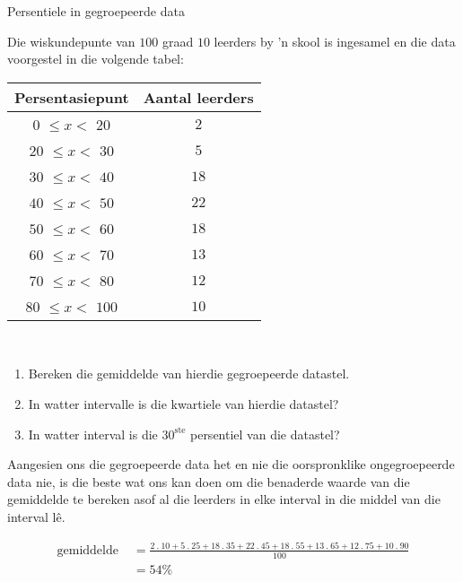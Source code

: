 \begin{wex}{Persentiele in gegroepeerde data}
{Die wiskundepunte van $100$ graad $10$ leerders by ’n skool is ingesamel en die data voorgestel in die volgende tabel:\\
    \begin{center}
      \begin{tabular}{|c|c|}  \hline
       
       \textbf{Persentasiepunt} & \textbf{Aantal leerders} \\  \hline

         $0$  $ \leq x < $   $20$ &  $2$ \\ \hline
        $20$  $ \leq x < $   $30$ &  $5$ \\\hline
        $30$  $ \leq x < $   $40$ & $18$ \\\hline
        $40$  $ \leq x < $   $50$ & $22$ \\\hline
        $50$  $ \leq x < $   $60$ & $18$ \\\hline
        $60$  $ \leq x < $   $70$ & $13$ \\\hline
        $70$  $ \leq x < $   $80$ & $12$ \\\hline
        $80$  $ \leq x < $  $100$ & $10$ \\\hline
   
      \end{tabular}
    \end{center}
\vspace {8pt}\\
    \begin{enumerate}[noitemsep, label=\textbf{\arabic*}.]
    \item Bereken die gemiddelde van hierdie gegroepeerde datastel.
    \item In watter intervalle is die kwartiele van hierdie datastel?
    \item In watter interval is die $30^{\mathrm{ste}}$ persentiel van die datastel?
    \end{enumerate}
}{

  Aangesien ons die gegroepeerde data het en nie die oorspronklike ongegroepeerde data nie, is die beste wat ons kan doen om die benaderde waarde van die gemiddelde te bereken asof al die leerders in elke interval in die middel van die interval l\^e.

  \begin{align*}
 \mbox{gemiddelde } &=  \frac{
         2\:.\:10
      +  5\:.\:25
      + 18\:.\:35
      + 22\:.\:45
      + 18\:.\:55
      + 13\:.\:65
      + 12\:.\:75
      + 10\:.\:90
    }{100}\\
    &= 54\%
  \end{align*}

}
\end{wex}
